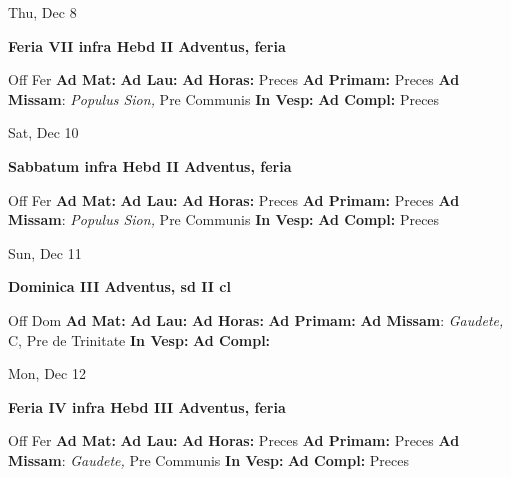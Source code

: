 \documentclass[10pt]{article}
\begin{document}
\begin{minipage}{3.5in}
\vspace{2em}\begin{center}
Thu, Dec 8
\end{center}\textbf{ \large Feria VII infra Hebd II Adventus, \textnormal{\normalsize feria}}
\begin{justify}
Off Fer
\textbf{Ad Mat: }
\textbf{Ad Lau: }
\textbf{Ad Horas: }Preces
\textbf{Ad Primam: }Preces
\textbf{Ad Missam}: \textit{Populus Sion,} Pre Communis
\textbf{In Vesp: }
\textbf{Ad Compl: }Preces\end{justify}
\end{minipage}



\begin{minipage}{3.5in}
\vspace{2em}\begin{center}
Sat, Dec 10
\end{center}\textbf{ \large Sabbatum infra Hebd II Adventus, \textnormal{\normalsize feria}}
\begin{justify}
Off Fer
\textbf{Ad Mat: }
\textbf{Ad Lau: }
\textbf{Ad Horas: }Preces
\textbf{Ad Primam: }Preces
\textbf{Ad Missam}: \textit{Populus Sion,} Pre Communis
\textbf{In Vesp: }
\textbf{Ad Compl: }Preces\end{justify}
\end{minipage}



\begin{minipage}{3.5in}
\vspace{2em}\begin{center}
Sun, Dec 11
\end{center}\textbf{ \large Dominica III Adventus, \textnormal{\normalsize sd II cl}}
\begin{justify}
Off Dom
\textbf{Ad Mat: }
\textbf{Ad Lau: }
\textbf{Ad Horas: }
\textbf{Ad Primam: }
\textbf{Ad Missam}: \textit{Gaudete,} C, Pre de Trinitate
\textbf{In Vesp: }
\textbf{Ad Compl: }\end{justify}
\end{minipage}



\begin{minipage}{3.5in}
\vspace{2em}\begin{center}
Mon, Dec 12
\end{center}\textbf{ \large Feria IV infra Hebd III Adventus, \textnormal{\normalsize feria}}
\begin{justify}
Off Fer
\textbf{Ad Mat: }
\textbf{Ad Lau: }
\textbf{Ad Horas: }Preces
\textbf{Ad Primam: }Preces
\textbf{Ad Missam}: \textit{Gaudete,} Pre Communis
\textbf{In Vesp: }
\textbf{Ad Compl: }Preces\end{justify}
\end{minipage}
\end{document}
